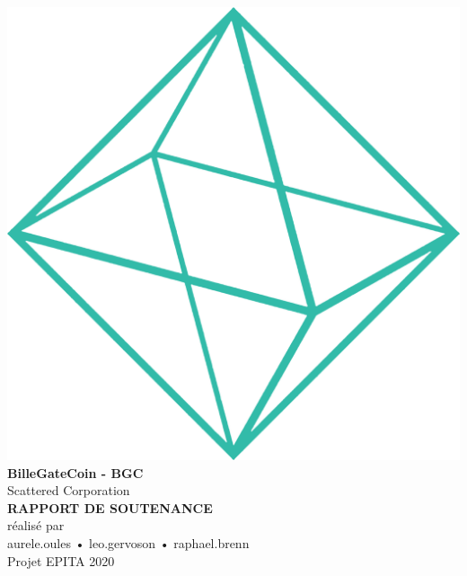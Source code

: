 \documentclass{article}
\begin{document}
\makeatletter
    \begin{titlepage}
        \begin{center}
            \pagecolor{background}
            \color{white}
            \includegraphics[width=0.5\linewidth]{assets/shape.png}\\[10ex]
            {\huge \bfseries BilleGateCoin - BGC}\\[2ex] 
            {\LARGE Scattered Corporation}\\[10ex]
            
            {\huge \bfseries RAPPORT DE SOUTENANCE}\\[5ex]
            \large{réalisé par\\[2ex]aurele.oules  •  leo.gervoson  •  raphael.brenn}\\[16ex] 
            {\large Projet EPITA 2020}
        \end{center}
    \end{titlepage}
\makeatother
\thispagestyle{empty}

\newpage
\begin{center}
\color{white}
\tableofcontents
\end{center}
\newpage
\pagecolor{white}
\sectionfont{\color{greendark}}  %

\fancyhf{}
\renewcommand{\headrulewidth}{0pt}
\renewcommand{\footrulewidth}{1pt}
\newcommand\bold[1]{\textcolor{green}{\bfseries{#1}}}
\newcommand\boldblack[1]{\textcolor{background}{\bfseries{#1}}}
\renewcommand{\footrule}{\hbox to\headwidth{\color{green}\leaders\hrule height \footrulewidth\hfill}}

\rfoot{\thepage}
\pagestyle{fancy}
\renewcommand\seriesdefault{l}
\end{document}
